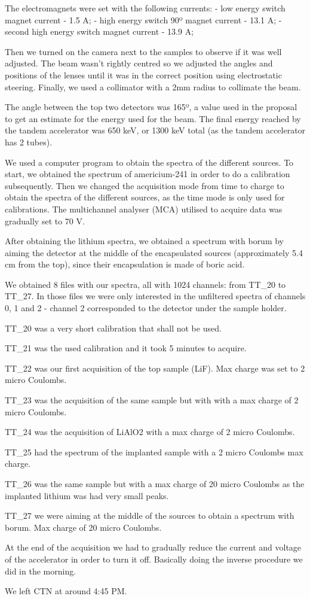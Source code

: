\documentclass{article}
\begin{document}
The electromagnets were set with the following currents:
- low energy switch magnet current - 1.5 A;
- high energy switch 90º magnet current - 13.1 A;
- second high energy switch magnet current - 13.9 A;

Then we turned on the camera next to the samples to observe if it was well adjusted. The beam wasn't rightly centred so we adjusted the angles and positions of the lenses until it was in the correct position using electrostatic steering. Finally, we used a collimator with a 2mm radius to collimate the beam. 

The angle between the top two detectors was 165º, a value used in the proposal to get an estimate for the energy used for the beam. The final energy reached by the tandem accelerator was 650 keV, or 1300 keV total (as the tandem accelerator has 2 tubes).
    
We used a computer program to obtain the spectra of the different sources. To start, we obtained the spectrum of americium-241 in order to do a calibration subsequently. Then we changed the acquisition mode from time to charge to obtain the spectra of the different sources, as the time mode is only used for calibrations. The multichannel analyser (MCA) utilised to acquire data was gradually set to 70 V. 

After obtaining the lithium spectra, we obtained a spectrum with borum by aiming the detector at the middle of the encapsulated sources (approximately 5.4 cm from the top), since their encapsulation is made of boric acid.

We obtained 8 files with our spectra, all with 1024 channels: from TT\_20 to TT\_27. In those files we were only interested in the unfiltered spectra of channels 0, 1 and 2 - channel 2 corresponded to the detector under the sample holder.

TT\_20 was a very short calibration that shall not be used.

TT\_21 was the used calibration and it took 5 minutes to acquire.

TT\_22 was our first acquisition of the top sample (LiF). Max charge was set to 2 micro Coulombs.

TT\_23 was the acquisition of the same sample but with with a max charge of 2 micro Coulombs.

TT\_24 was the acquisition of LiAlO2 with a max charge of 2 micro Coulombs.

TT\_25 had the spectrum of the implanted sample with a 2 micro Coulombs max charge.

TT\_26 was the same sample but with a max charge of 20 micro Coulombs as the implanted lithium was had very small peaks.

TT\_27 we were aiming at the middle of the sources to obtain a spectrum with borum. Max charge of 20 micro Coulombs.

At the end of the acquisition we had to gradually reduce the current and voltage of the accelerator in order to turn it off. Basically doing the inverse procedure we did in the morning.

We left CTN at around 4:45 PM.

\vspace{3cm}


\printbibliography
\nocite{*}
\end{document}
